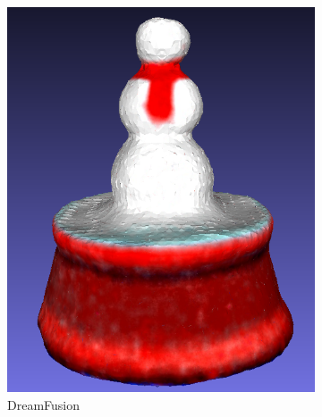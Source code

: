 \begin{figure}[ht]
    \centering
    \small
    \begin{subfigure}[b]{0.232\textwidth}
        \centering
        \includegraphics[width=\textwidth]{etc/a detailed rendering of a snow globe containing a snowman/dreamfusion/dreamfusion_globe_result.png}
        \caption{DreamFusion}
        \vspace{0.1cm}
    \end{subfigure}
    \begin{subfigure}[b]{0.17\textwidth}
        \centering

\end{subfigure}
\end{figure}
